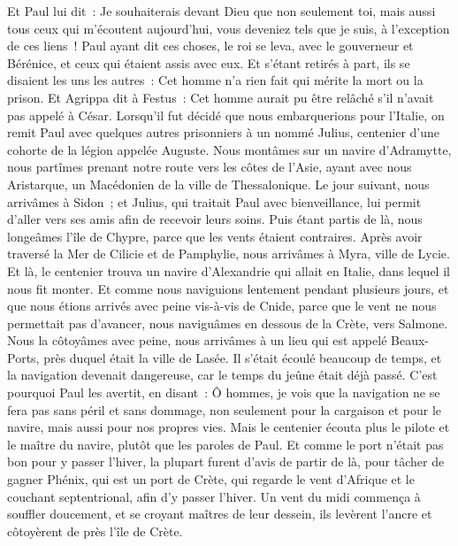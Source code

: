 \begin{multicols}{2}
Et Paul lui dit~: Je souhaiterais devant Dieu que non seulement toi, mais aussi tous ceux qui m'écoutent aujourd'hui, vous deveniez tels que je suis, à l'exception de ces liens~!
Paul ayant dit ces choses, le roi se leva, avec le gouverneur et Bérénice, et ceux qui étaient assis avec eux.
Et s'étant retirés à part, ils se disaient les uns les autres~: Cet homme n'a rien fait qui mérite la mort ou la prison.
Et Agrippa dit à Festus~: Cet homme aurait pu être relâché s'il n'avait pas appelé à César.
\VerseOne{}Lorsqu'il fut décidé que nous embarquerions pour l'Italie, on remit Paul avec quelques autres prisonniers à un nommé Julius, centenier d'une cohorte de la légion appelée Auguste.
Nous montâmes sur un navire d'Adramytte, nous partîmes prenant notre route vers les côtes de l'Asie, ayant avec nous Aristarque, un Macédonien de la ville de Thessalonique.
Le jour suivant, nous arrivâmes à Sidon~; et Julius, qui traitait Paul avec bienveillance, lui permit d'aller vers ses amis afin de recevoir leurs soins.
Puis étant partis de là, nous longeâmes l'île de Chypre, parce que les vents étaient contraires.
Après avoir traversé la Mer de Cilicie et de Pamphylie, nous arrivâmes à Myra, ville de Lycie.
Et là, le centenier trouva un navire d'Alexandrie qui allait en Italie, dans lequel il nous fit monter.
Et comme nous naviguions lentement pendant plusieurs jours, et que nous étions arrivés avec peine vis-à-vis de Cnide, parce que le vent ne nous permettait pas d'avancer, nous naviguâmes en dessous de la Crète, vers Salmone.
Nous la côtoyâmes avec peine, nous arrivâmes à un lieu qui est appelé Beaux-Ports, près duquel était la ville de Lasée.
Il s'était écoulé beaucoup de temps, et la navigation devenait dangereuse, car le temps du jeûne était déjà passé.
C'est pourquoi Paul les avertit, en disant~: Ô hommes, je vois que la navigation ne se fera pas sans péril et sans dommage, non seulement pour la cargaison et pour le navire, mais aussi pour nos propres vies.
Mais le centenier écouta plus le pilote et le maître du navire, plutôt que les paroles de Paul.
Et comme le port n'était pas bon pour y passer l'hiver, la plupart furent d'avis de partir de là, pour tâcher de gagner Phénix, qui est un port de Crète, qui regarde le vent d'Afrique et le couchant septentrional, afin d'y passer l'hiver.
Un vent du midi commença à souffler doucement, et se croyant maîtres de leur dessein, ils levèrent l'ancre et côtoyèrent de près l'île de Crète.

\end{multicols}
